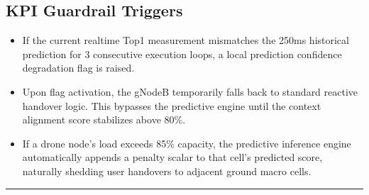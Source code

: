 \documentclass[letterpaper,10pt,english]{sphinxmanual}
\begin{document}
\subsection{KPI Guardrail Triggers}
\label{\detokenize{deployement:kpi-guardrail-triggers}}\begin{itemize}
\item {} 
\sphinxAtStartPar
{} If the current real\sphinxhyphen{}time Top\sphinxhyphen{}1 measurement mismatches the 250ms historical prediction for 3 consecutive execution loops, a local prediction confidence degradation flag is raised.

\item {} 
\sphinxAtStartPar
{} Upon flag activation, the gNodeB temporarily falls back to standard  reactive handover logic. This bypasses the predictive engine until the context alignment score stabilizes above 80\%.

\item {} 
\sphinxAtStartPar
{} If a drone node’s load exceeds 85\% capacity, the predictive inference engine automatically appends a penalty scalar to that cell’s predicted score, naturally shedding user handovers to adjacent ground macro cells.

\end{itemize}


\bigskip\hrule\bigskip
\end{document}
